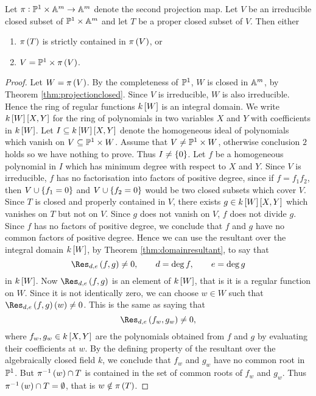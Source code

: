 \pagebreak

\begin{lemma}
\label{lem:projectioneither}
Let $ \pi : \PP^1 \times \AA^m \to \AA^m $ denote the second projection map. Let $ V $ be an irreducible closed subset of $ \PP^1 \times \AA^m $ and let $ T $ be a proper closed subset of $ V $. Then either
\begin{enumerate}
\item $ \pi\br{T} $ is strictly contained in $ \pi\br{V} $, or
\item $ V = \PP^1 \times \pi\br{V} $.
\end{enumerate}
\end{lemma}

\begin{proof}
Let $ W = \pi\br{V} $. By the completeness of $ \PP^1 $, $ W $ is closed in $ \AA^m $, by Theorem \ref{thm:projectionclosed}. Since $ V $ is irreducible, $ W $ is also irreducible. Hence the ring of regular functions $ k\sbr{W} $ is an integral domain. We write $ k\sbr{W}\sbr{X, Y} $ for the ring of polynomials in two variables $ X $ and $ Y $ with coefficients in $ k\sbr{W} $. Let $ I \subseteq k\sbr{W}\sbr{X, Y} $ denote the homogeneous ideal of polynomials which vanish on $ V \subseteq \PP^1 \times W $. Assume that $ V \ne \PP^1 \times W $, otherwise conclusion $ 2 $ holds so we have nothing to prove. Thus $ I \ne \cbr{0} $. Let $ f $ be a homogeneous polynomial in $ I $ which has minimum degree with respect to $ X $ and $ Y $. Since $ V $ is irreducible, $ f $ has no factorisation into factors of positive degree, since if $ f = f_1f_2 $, then $ V \cup \cbr{f_1 = 0} $ and $ V \cup \cbr{f_2 = 0} $ would be two closed subsets which cover $ V $. Since $ T $ is closed and properly contained in $ V $, there exists $ g \in k\sbr{W}\sbr{X, Y} $ which vanishes on $ T $ but not on $ V $. Since $ g $ does not vanish on $ V $, $ f $ does not divide $ g $. Since $ f $ has no factors of positive degree, we conclude that $ f $ and $ g $ have no common factors of positive degree. Hence we can use the resultant over the integral domain $ k\sbr{W} $, by Theorem \ref{thm:domainresultant}, to say that
$$ \Res_{d, e}\br{f, g} \ne 0, \qquad d = \deg f, \qquad e = \deg g $$
in $ k\sbr{W} $. Now $ \Res_{d, e}\br{f, g} $ is an element of $ k\sbr{W} $, that is it is a regular function on $ W $. Since it is not identically zero, we can choose $ w \in W $ such that $ \Res_{d, e}\br{f, g}\br{w} \ne 0 $. This is the same as saying that
$$ \Res_{d, e}\br{f_w, g_w} \ne 0, $$
where $ f_w, g_w \in k\sbr{X, Y} $ are the polynomials obtained from $ f $ and $ g $ by evaluating their coefficients at $ w $. By the defining property of the resultant over the algebraically closed field $ k $, we conclude that $ f_w $ and $ g_w $ have no common root in $ \PP^1 $. But $ \pi^{-1}\br{w} \cap T $ is contained in the set of common roots of $ f_w $ and $ g_w $. Thus $ \pi^{-1}\br{w} \cap T = \emptyset $, that is $ w \notin \pi\br{T} $.
\end{proof}

